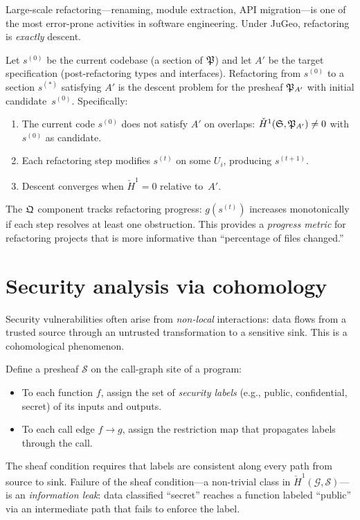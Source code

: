 Large-scale refactoring---renaming, module extraction, API
migration---is one of the most error-prone activities in software
engineering.  Under JuGeo, refactoring is \emph{exactly} descent.

\begin{proposition}[Refactoring = Descent]
\label{prop:refactoring}
Let $s^{(0)}$ be the current codebase (a section of $\mathfrak{P}$) and
let $A'$ be the target specification (post-refactoring types and
interfaces).  Refactoring from $s^{(0)}$ to a section $s^{(*)}$
satisfying $A'$ is the descent problem for the presheaf
$\mathfrak{P}_{A'}$ with initial candidate~$s^{(0)}$.  Specifically:
\begin{enumerate}
  \item The current code $s^{(0)}$ does not satisfy $A'$ on overlaps:
        $\check{H}^1(\mathfrak{S}, \mathfrak{P}_{A'}) \neq 0$ with $s^{(0)}$ as
        candidate.
  \item Each refactoring step modifies $s^{(t)}$ on some $U_i$,
        producing $s^{(t+1)}$.
  \item Descent converges when $\check{H}^1 = 0$ relative to~$A'$.
\end{enumerate}
\end{proposition}

The $\mathfrak{Q}$ component tracks refactoring progress:
$g(s^{(t)})$ increases monotonically if each step resolves at least
one obstruction.  This provides a \emph{progress metric} for
refactoring projects that is more informative than ``percentage of
files changed.''

\section{Security analysis via cohomology}
\label{sec:security}

Security vulnerabilities often arise from \emph{non-local}
interactions: data flows from a trusted source through an untrusted
transformation to a sensitive sink.  This is a cohomological
phenomenon.

\begin{construction}
\label{con:security-presheaf}
Define a presheaf $\mathcal{S}$ on the call-graph site of a program:
\begin{itemize}
  \item To each function $f$, assign the set of
        \emph{security labels} (e.g., public, confidential, secret)
        of its inputs and outputs.
  \item To each call edge $f \to g$, assign the restriction map
        that propagates labels through the call.
\end{itemize}
The sheaf condition requires that labels are consistent along every
path from source to sink.  Failure of the sheaf condition---a
non-trivial class in $\check{H}^1(\mathcal{G}, \mathcal{S})$---is
an \emph{information leak}: data classified ``secret'' reaches a
function labeled ``public'' via an intermediate path that fails to
enforce the label.
\end{construction}

